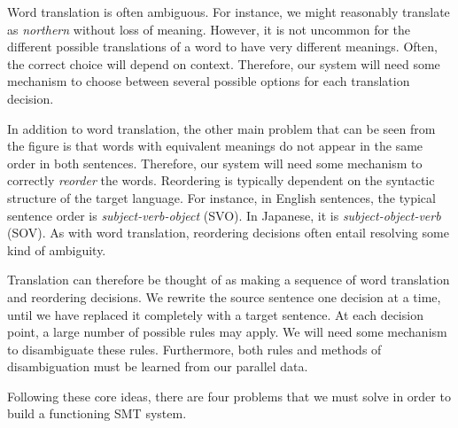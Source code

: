 Word translation is often ambiguous.  
For instance, we might reasonably translate  
 as {\em northern} without loss of
meaning.  However, it is not uncommon for the different
possible translations of a word to have very different
meanings.  Often, the correct choice
will depend on context.  Therefore, our 
system will need some mechanism to choose between 
several possible options for each translation decision.

In addition to word translation, the other main
problem that can be seen from the figure is that
words with equivalent meanings do not appear in the
same order in both sentences.  Therefore, our
system will need some mechanism to correctly {\em reorder} the
words.  Reordering is typically dependent on the syntactic
structure of the target language.  For instance, in English
sentences, the typical sentence order is 
{\em subject-verb-object} (SVO).  In
Japanese, it is {\em subject-object-verb} (SOV).
As with word translation, reordering decisions often
entail resolving some kind of ambiguity.

Translation can therefore be thought of as making
a sequence of word translation and reordering
decisions.  We rewrite the source sentence
one decision at a time, until we have replaced
it completely with a target sentence.  At each decision
point, a large number of possible rules may apply.  We
will need some mechanism to disambiguate these rules.
Furthermore, both rules and methods of disambiguation
must be learned from our parallel data.

Following these core ideas, there are 
four problems that we must solve in order
to build a functioning SMT system.

